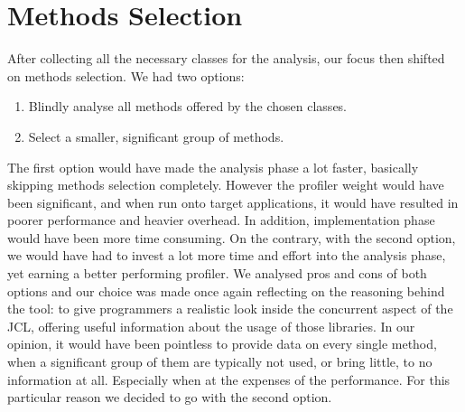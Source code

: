 \documentclass[]{usiinfthesis}
\begin{document}
\section{Methods Selection}
After collecting all the necessary classes for the analysis, our focus then shifted on methods selection. We had two options:
\begin{enumerate}
    \item Blindly analyse all methods offered by the chosen classes.
    \item Select a smaller, significant group of methods.
\end{enumerate}
 The first option would have made the analysis phase a lot faster, basically skipping methods selection completely. However the profiler weight would have been significant, and when run onto target applications, it would have resulted in poorer performance and heavier overhead. In addition, implementation phase would have been more time consuming. On the contrary, with the second option, we would have had to invest a lot more time and effort into the analysis phase, yet earning a better performing profiler. We analysed pros and cons of both options and our choice was made once again reflecting on the reasoning behind the tool: to give programmers a realistic look inside the concurrent aspect of the JCL, offering useful information about the usage of those libraries. In our opinion, it would have been pointless to provide data on every single method, when a significant group of them are typically not used, or bring little, to no information at all. Especially when at the expenses of the performance. For this particular reason we decided to go with the second option.
 
\end{document}
